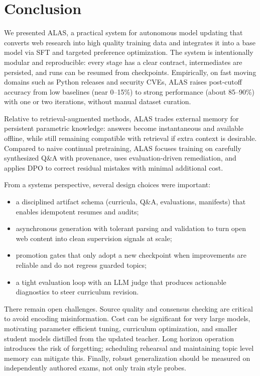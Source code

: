 \documentclass[11pt]{article}
\begin{document}
\section{Conclusion}
We presented ALAS, a practical system for autonomous model updating that converts web research into high quality training data and integrates it into a base model via SFT and targeted preference optimization. The system is intentionally modular and reproducible: every stage has a clear contract, intermediates are persisted, and runs can be resumed from checkpoints. Empirically, on fast moving domains such as Python releases and security CVEs, ALAS raises post-cutoff accuracy from low baselines (near 0--15\%) to strong performance (about 85--90\%) with one or two iterations, without manual dataset curation.

Relative to retrieval-augmented methods, ALAS trades external memory for persistent parametric knowledge: answers become instantaneous and available offline, while still remaining compatible with retrieval if extra context is desirable. Compared to naive continual pretraining, ALAS focuses training on carefully synthesized Q\&A with provenance, uses evaluation-driven remediation, and applies DPO to correct residual mistakes with minimal additional cost.

From a systems perspective, several design choices were important:
\begin{itemize}
  \item a disciplined artifact schema (curricula, Q\&A, evaluations, manifests) that enables idempotent resumes and audits;
  \item asynchronous generation with tolerant parsing and validation to turn open web content into clean supervision signals at scale;
  \item promotion gates that only adopt a new checkpoint when improvements are reliable and do not regress guarded topics;
  \item a tight evaluation loop with an LLM judge that produces actionable diagnostics to steer curriculum revision.
\end{itemize}

There remain open challenges. Source quality and consensus checking are critical to avoid encoding misinformation. Cost can be significant for very large models, motivating parameter efficient tuning, curriculum optimization, and smaller student models distilled from the updated teacher. Long horizon operation introduces the risk of forgetting; scheduling rehearsal and maintaining topic level memory can mitigate this. Finally, robust generalization should be measured on independently authored exams, not only train style probes.
\end{document}
